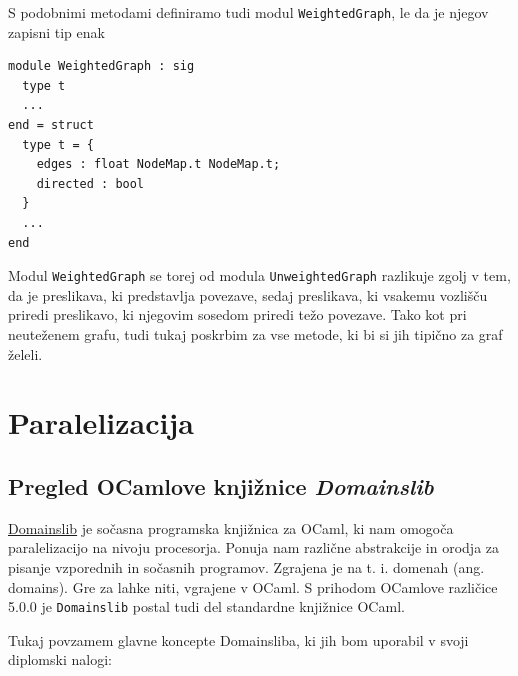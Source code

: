 \documentclass[mat1, tisk]{fmfdelo}
\begin{document}
S podobnimi metodami definiramo tudi modul \texttt{WeightedGraph}, le da je njegov zapisni
tip enak
\begin{lstlisting}
module WeightedGraph : sig
  type t
  ...
end = struct
  type t = {
    edges : float NodeMap.t NodeMap.t; 
    directed : bool
  }
  ...
end
\end{lstlisting}

Modul \texttt{WeightedGraph} se torej od modula \texttt{UnweightedGraph} razlikuje zgolj v tem, da je preslikava, ki
predstavlja povezave, sedaj preslikava, ki vsakemu vozlišču priredi preslikavo, ki njegovim sosedom priredi težo povezave.
Tako kot pri neuteženem grafu, tudi tukaj poskrbim za vse metode, ki bi si jih tipično za graf želeli.

\section{Paralelizacija}

\subsection{Pregled OCamlove knjižnice \textit{Domainslib}} \label{sec:pregled_domainslib}

\href{https://github.com/ocaml-multicore/domainslib}{Domainslib} je sočasna programska knjižnica za OCaml, 
ki nam omogoča paralelizacijo na nivoju procesorja. Ponuja nam različne abstrakcije in orodja za pisanje vzporednih
in sočasnih programov. Zgrajena je na t. i. domenah (ang. domains). Gre za lahke niti, vgrajene v OCaml.
S prihodom OCamlove različice 5.0.0 je \texttt{Domainslib} postal tudi del standardne knjižnice OCaml.

Tukaj povzamem glavne koncepte Domainsliba, ki jih bom uporabil v svoji diplomski nalogi:
\end{document}
